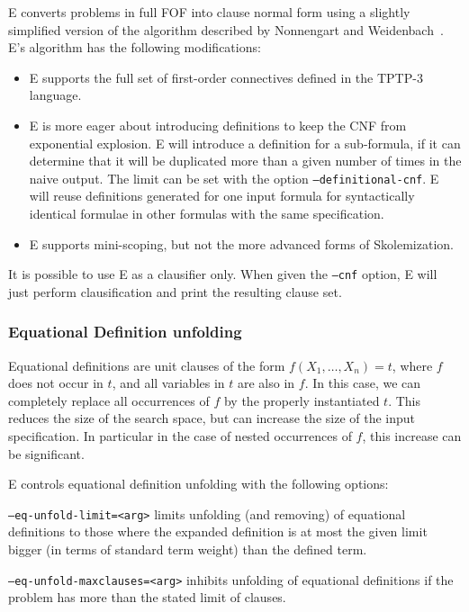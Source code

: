 \documentclass{report}
\begin{document}
E converts problems in full FOF into clause normal form using a
slightly simplified version of the algorithm described by Nonnengart
and Weidenbach~\cite{NW:SmallCNF-2001}. E's
algorithm has the following modifications:
\begin{itemize}
\item E supports the full set of first-order connectives defined in
  the TPTP-3 language.
\item E is more eager about introducing definitions to keep the CNF
  from exponential explosion. E will introduce a definition for a
  sub-formula, if it can determine that it will be duplicated more than
  a given number of times in the naive output. The limit can be set
  with the option \texttt{--definitional-cnf}. E will reuse
  definitions generated for one input formula for syntactically
  identical formulae in other formulas with the same specification.
\item E supports mini-scoping, but not the more advanced forms of
  Skolemization.
\end{itemize}

It is possible to use E as a clausifier only. When given the
\texttt{--cnf} option, E will just perform clausification and print
the resulting clause set.


\subsubsection{Equational Definition unfolding}
\label{sec:eqdef}

Equational definitions are unit clauses of the form $f(X_1, \ldots,
X_n)=t$, where $f$ does not occur in $t$, and all variables in $t$ are
also in $f$. In this case, we can completely replace all occurrences of
$f$ by the properly instantiated $t$. This reduces the size of the
search space, but can increase the size of the input specification. In
particular in the case of nested occurrences of $f$, this increase can
be significant.

E controls equational definition unfolding with the following options:

\texttt{--eq-unfold-limit=<arg>} limits unfolding (and removing) of
equational definitions to those where the expanded definition is at
most the given limit bigger (in terms of standard term weight) than
the defined term.

\texttt{--eq-unfold-maxclauses=<arg>} inhibits  unfolding of
equational definitions if the problem has more than the stated limit
of clauses.
\end{document}
